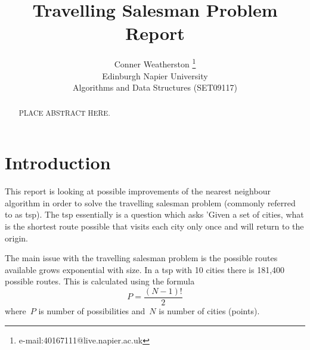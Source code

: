 \documentclass[conference,backref=page]{acmsiggraph}
\title{Travelling Salesman Problem\\
	   Report}
\author{Conner Weatherston \thanks{e-mail:40167111@live.napier.ac.uk} \\
Edinburgh Napier University\\
Algorithms and Data Structures (SET09117)}
\begin{document}

\maketitle

\raggedbottom

\begin{abstract}

PLACE ABSTRACT HERE.

\end{abstract}



\keywordlist


\section{Introduction}

This report is looking at possible improvements of the nearest neighbour algorithm in order to solve the travelling salesman problem (commonly referred to as tsp). The tsp essentially is a question which asks 'Given a set of cities, what is the shortest route possible that visits each city only once and will return to the origin.

The main issue with the travelling salesman problem is the possible routes available grows exponential with size. In a tsp with 10 cities there is 181,400 possible routes. This is calculated using the formula
 \begin{equation}
P =  \frac{(N-1)!}{2}
\end{equation}
where~$P$ is number of possibilities and~$N$ is number of cities (points).
\end{document}
